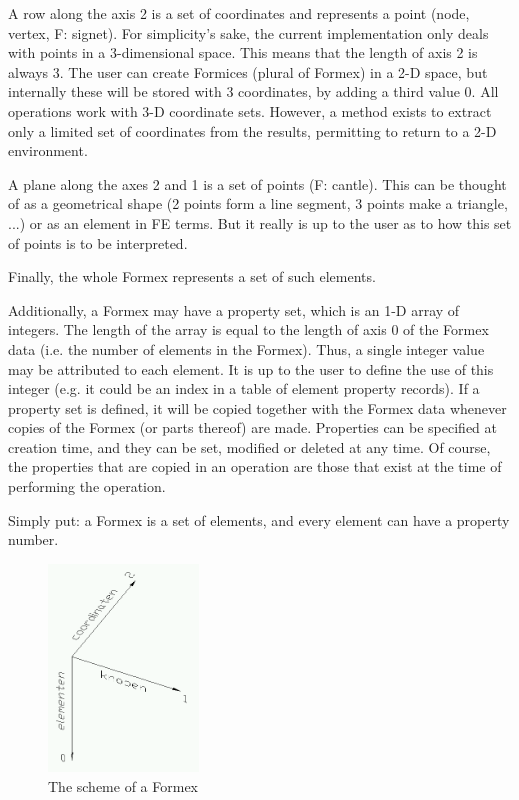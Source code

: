{    A row along the axis 2 is a set of coordinates and represents a point
    (node, vertex, F: signet).
    For simplicity's sake, the current implementation only deals with points
    in a 3-dimensional space. This means that the length of axis 2 is always 3.
    The user can create Formices (plural of Formex) in a 2-D space, but
    internally these will be stored with 3 coordinates, by adding a third
    value 0. All operations work with 3-D coordinate sets. However, a method
    exists to extract only a limited set of coordinates from the results,
    permitting to return to a 2-D environment.

    A plane along the axes 2 and 1 is a set of points (F: cantle). This can be
    thought of as a geometrical shape (2 points form a line segment, 3 points
    make a triangle, ...) or as an element in FE terms. But it really is up to
    the user as to how this set of points is to be interpreted.

    Finally, the whole Formex represents a set of such elements.

    Additionally, a Formex may have a property set, which is an 1-D array of
    integers. The length of the array is equal to the length of axis 0 of the
    Formex data (i.e. the number of elements in the Formex). Thus, a single
    integer value may be attributed to each element. It is up to the user to
    define the use of this integer (e.g. it could be an index in a table of
    element property records).
    If a property set is defined, it will be copied together with the Formex
    data whenever copies of the Formex (or parts thereof) are made.
    Properties can be specified at creation time, and they can be set,
    modified or deleted at any time. Of course, the properties that are
    copied in an operation are those that exist at the time of performing
    the operation.   

Simply put: a Formex is a set of elements, and every element can have a property number.
\begin{figure}[h]
  \centering
  \begin{makeimage}
  \end{makeimage}
  \begin{latexonly}
    \includegraphics[width=4cm]{images/Formex}
  \end{latexonly}
  \begin{htmlonly}
  \end{htmlonly}  
  \caption{The scheme of a Formex}
\end{figure}

}
